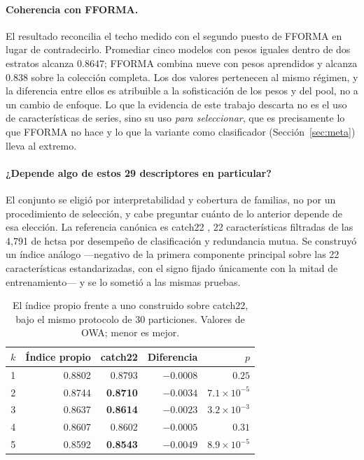 \paragraph{Coherencia con FFORMA.} El resultado reconcilia el techo medido con el
segundo puesto de FFORMA en lugar de contradecirlo. Promediar cinco modelos con pesos
iguales dentro de dos estratos alcanza $0.8647$; FFORMA combina nueve con pesos
aprendidos y alcanza $0.838$ sobre la colección completa. Los dos valores pertenecen al
mismo régimen, y la diferencia entre ellos es atribuible a la sofisticación de los pesos
y del pool, no a un cambio de enfoque. Lo que la evidencia de este trabajo descarta no
es el uso de características de series, sino su uso \emph{para seleccionar}, que es
precisamente lo que FFORMA no hace y lo que la variante como clasificador
(Sección~\ref{sec:meta}) lleva al extremo.

\paragraph{¿Depende algo de estos 29 descriptores en particular?} El conjunto se
eligió por interpretabilidad y cobertura de familias, no por un procedimiento de
selección, y cabe preguntar cuánto de lo anterior depende de esa elección. La referencia
canónica es catch22 \cite{lubba2019}, 22 características filtradas de las 4{,}791 de
hctsa por desempeño de clasificación y redundancia mutua. Se construyó un índice análogo
---negativo de la primera componente principal sobre las 22 características
estandarizadas, con el signo fijado únicamente con la mitad de entrenamiento--- y se lo
sometió a las mismas pruebas.

\begin{table}[htbp]
\centering
\caption{El índice propio frente a uno construido sobre catch22, bajo el mismo protocolo
de 30 particiones. Valores de OWA; menor es mejor.}
\label{tab:catch22}
\begin{tabular}{crrrr}
\toprule
$k$ & \textbf{Índice propio} & \textbf{catch22} & \textbf{Diferencia} & \textbf{$p$} \\
\midrule
1 & 0.8802 & 0.8793 & $-0.0008$ & $0.25$ \\
2 & 0.8744 & \textbf{0.8710} & $-0.0034$ & $7.1\times10^{-5}$ \\
3 & 0.8637 & \textbf{0.8614} & $-0.0023$ & $3.2\times10^{-3}$ \\
4 & 0.8607 & 0.8602 & $-0.0005$ & $0.31$ \\
5 & 0.8592 & \textbf{0.8543} & $-0.0049$ & $8.9\times10^{-5}$ \\
\bottomrule
\end{tabular}
\end{table}


